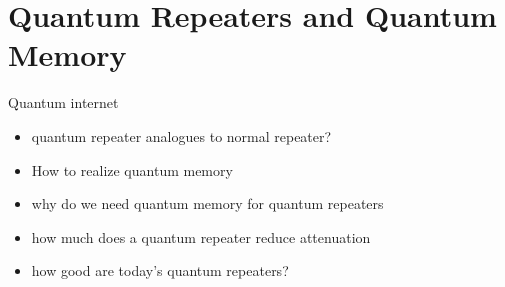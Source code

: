 \section{Quantum Repeaters and Quantum Memory}
Quantum internet \cite{Azuma:2023}
\begin{itemize}
    \item quantum repeater analogues to normal repeater?
    \item How to realize quantum memory 
    \item why do we need quantum memory for quantum repeaters
    \item how much does a quantum repeater reduce attenuation
    \item how good are today's quantum repeaters?
\end{itemize}